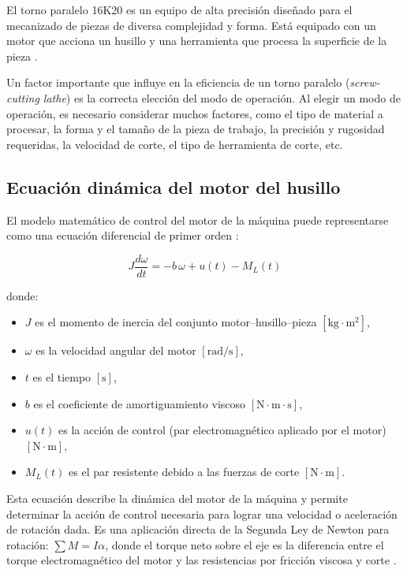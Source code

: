 \documentclass[12pt,a4paper]{article}
\begin{document}
El torno paralelo 16K20 es un equipo de alta precisión diseñado para el mecanizado de piezas de diversa complejidad y forma. Está equipado con un motor que acciona un husillo y una herramienta que procesa la superficie de la pieza \cite{urinov2024}.

Un factor importante que influye en la eficiencia de un torno paralelo (\textit{screw-cutting lathe}) es la correcta elección del modo de operación. Al elegir un modo de operación, es necesario considerar muchos factores, como el tipo de material a procesar, la forma y el tamaño de la pieza de trabajo, la precisión y rugosidad requeridas, la velocidad de corte, el tipo de herramienta de corte, etc.

\subsection{Ecuación dinámica del motor del husillo}
\label{subsec:ecuacion_motor}

El modelo matemático de control del motor de la máquina puede representarse como una ecuación diferencial de primer orden \cite{urinov2024}:

\begin{equation}
    J \frac{d\omega}{dt} = -b\,\omega + u(t) - M_L(t)
    \label{eq:motor_1er_orden}
\end{equation}

donde:
\begin{itemize}[itemsep=1pt, topsep=1pt, parsep=0pt]
    \item $J$ es el momento de inercia del conjunto motor--husillo--pieza $[\si{\kilo\gram\cdot\meter\squared}]$,
    \item $\omega$ es la velocidad angular del motor $[\si{\radian\per\second}]$,
    \item $t$ es el tiempo $[\si{\second}]$,
    \item $b$ es el coeficiente de amortiguamiento viscoso $[\si{\newton\cdot\meter\cdot\second}]$,
    \item $u(t)$ es la acción de control (par electromagnético aplicado por el motor) $[\si{\newton\cdot\meter}]$,
    \item $M_L(t)$ es el par resistente debido a las fuerzas de corte $[\si{\newton\cdot\meter}]$.
\end{itemize}

Esta ecuación describe la dinámica del motor de la máquina y permite determinar la acción de control necesaria para lograr una velocidad o aceleración de rotación dada. Es una aplicación directa de la Segunda Ley de Newton para rotación: $\sum M = I\alpha$, donde el torque neto sobre el eje es la diferencia entre el torque electromagnético del motor y las resistencias por fricción viscosa y corte \cite{hibbeler2016}.
\end{document}
